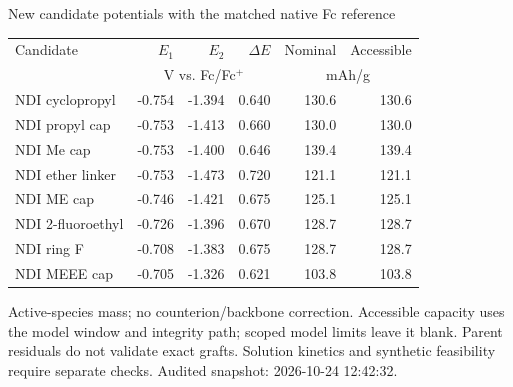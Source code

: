 \begin{frame}{New candidate potentials with the matched native Fc reference}
\scriptsize\renewcommand{\arraystretch}{1.25}\centering
\begin{tabular}{@{}p{4.7cm}rrrrr@{}}\toprule
Candidate & $E_1$ & $E_2$ & $\Delta E$ & Nominal & Accessible \\
& \multicolumn{3}{c}{V vs. Fc/Fc$^+$} & \multicolumn{2}{c}{mAh/g} \\ \midrule
NDI cyclopropyl & -0.754 & -1.394 & 0.640 & 130.6 & 130.6 \\
NDI propyl cap & -0.753 & -1.413 & 0.660 & 130.0 & 130.0 \\
NDI Me cap & -0.753 & -1.400 & 0.646 & 139.4 & 139.4 \\
NDI ether linker & -0.753 & -1.473 & 0.720 & 121.1 & 121.1 \\
NDI ME cap & -0.746 & -1.421 & 0.675 & 125.1 & 125.1 \\
NDI 2-fluoroethyl & -0.726 & -1.396 & 0.670 & 128.7 & 128.7 \\
NDI ring F & -0.708 & -1.383 & 0.675 & 128.7 & 128.7 \\
NDI MEEE cap & -0.705 & -1.326 & 0.621 & 103.8 & 103.8 \\
\bottomrule\end{tabular}\par
\vspace{1ex}\raggedright
\footnotesize Active-species mass; no counterion/backbone correction. Accessible capacity uses the model window and integrity path; scoped model limits leave it blank.
\vspace{1ex}\scriptsize Parent residuals do not validate exact grafts. Solution kinetics and synthetic feasibility require separate checks.
\vfill\scriptsize Audited snapshot: 2026-10-24 12:42:32.
\end{frame}
